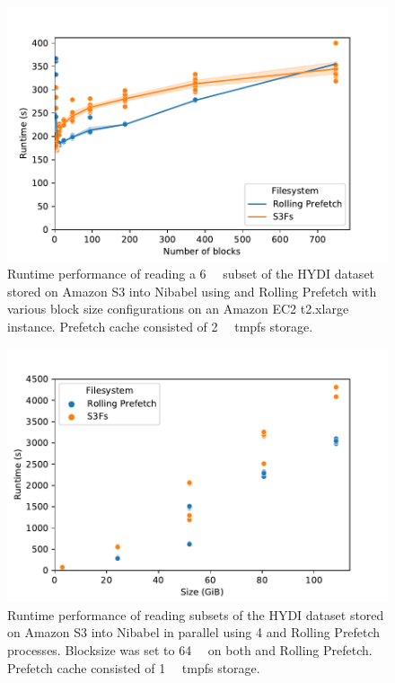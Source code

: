 \begin{figure}
\begin{center}
\includegraphics[width=\columnwidth]{figures/part3-chp1/blocksize.pdf}
\caption{Runtime performance of reading a \SI{6}{\gibi\byte} subset of the HYDI dataset stored on Amazon S3 into Nibabel using
\sfs and Rolling Prefetch with various block size configurations on an Amazon EC2 t2.xlarge instance. Prefetch cache consisted of  \SI{2}{\gibi\byte} tmpfs storage.}
\label{fig:blocksize}
\end{center}
\end{figure}

\begin{figure}
\begin{center}
\includegraphics[width=\columnwidth]{figures/part3-chp1/parallel.pdf}
\caption{Runtime performance of reading subsets of the HYDI dataset stored on Amazon S3 into Nibabel in parallel using 4
\sfs and Rolling Prefetch processes. Blocksize was set to \SI{64}{\mebi\byte} on both \sfs and Rolling Prefetch.
Prefetch cache consisted of \SI{1}{\gibi\byte} tmpfs storage.}
\label{fig:parallel}
\end{center}
\end{figure}



